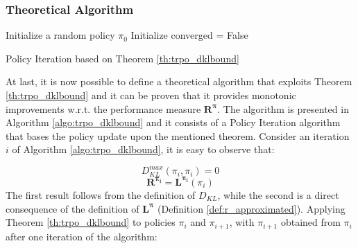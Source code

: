             \subsubsection{Theoretical Algorithm}
            \begin{algorithm}[t]
                \SetAlgoLined
                Initialize a random policy $\pi_{0}$\;
                Initialize converged = False\;
                \caption{Policy Iteration based on Theorem \ref{th:trpo_dklbound}}
                \label{algo:trpo_dklbound}
            \end{algorithm}
                
                At last, it is now possible to define a theoretical algorithm that exploits Theorem \ref{th:trpo_dklbound} and it can be proven that it provides monotonic improvements w.r.t. the performance measure $\mathbf{R^{\pi}}$. The algorithm is presented in Algorithm \ref{algo:trpo_dklbound} and it consists of a Policy Iteration algorithm that bases the policy update upon the mentioned theorem. Consider an iteration $i$ of Algorithm \ref{algo:trpo_dklbound}, it is easy to observe that:

                \begin{equation}
                \label{eq:trpo_dklalgo_0}
                    D_{KL}^{max}(\pi_{i}, \pi_{i}) = 0
                \end{equation}
                \begin{equation} 
                    \label{eq:trpo_dklalgo_1}
                    \mathbf{R^{\pi_{i}}} = \mathbf{L^{\pi_{i}}}(\pi_{i})
                \end{equation}
                The first result follows from the definition of $D_{KL}$, while the second is a direct consequence of the definition of $\mathbf{L^{\pi}}$ (Definition \ref{def:r_approximated}). Applying Theorem \ref{th:trpo_dklbound} to policies $\pi_{i}$ and $\pi_{i+1}$, with $\pi_{i+1}$ obtained from $\pi_{i}$ after one iteration of the algorithm:
                
